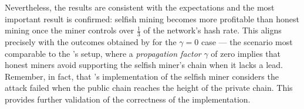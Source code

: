 Nevertheless, the results are consistent with the expectations and the most
important result is confirmed: selfish mining becomes more profitable than
honest mining once the miner controls over \(\frac{1}{3}\) of the network's
hash rate. This aligns precisely with the outcomes obtained by
\citeauthor{selfish-mining} for the \(\gamma = 0\) case --- the scenario most
comparable to the \iblock{}'s setup, where a \emph{propagation factor}
\(\gamma\) of zero implies that honest miners avoid supporting the selfish
miner's chain when it lacks a lead. Remember, in fact, that \iblock{}'s
implementation of the selfish miner considers the attack failed when the public
chain reaches the height of the private chain. This provides further validation
of the correctness of the \iblock{} implementation.
